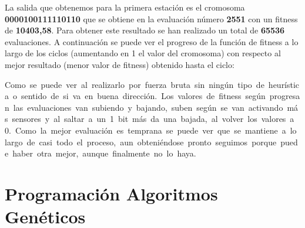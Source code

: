 \documentclass[12pt, spanish, pdftex]{UC3M_document}
\begin{document}
La salida que obtenemos para la primera estación es el cromosoma \textbf{0000100111110110} que se obtiene en la evaluación número \textbf{2551} con un fitness de \textbf{10403,58}. Para obtener este resultado se han realizado un total de \textbf{65536} evaluaciones. A continuación se puede ver el progreso de la función de fitness a lo largo de los ciclos (aumentando en 1 el valor del cromosoma) con respecto al mejor resultado (menor valor de fitness) obtenido hasta el ciclo:
\begin{figure}[H]
  {\def\svgwidth{.95\textwidth}
    }
\end{figure}
\vspace{-.7cm}
Como se puede ver al realizarlo por fuerza bruta sin ningún tipo de heurística o sentido de si va en buena dirección. Los valores de fitness según progresan las evaluaciones van subiendo y bajando, suben según se van activando más sensores y al saltar a un 1 bit más da una bajada, al volver los valores a 0. Como la mejor evaluación es temprana se puede ver que se mantiene a lo largo de casi todo el proceso, aun obteniéndose pronto seguimos porque puede haber otra mejor, aunque finalmente no lo haya.

\section{Programación Algoritmos Genéticos}
\end{document}

